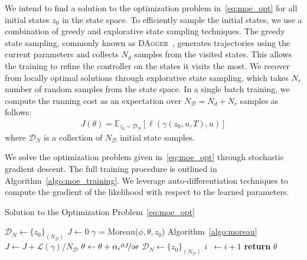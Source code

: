 We intend to find a solution to the optimization problem
in~\eqref{eq:moe_opt} for all initial states $z_0$ in the
state space.
%
To efficiently sample the initial states, we use a combination of greedy and
explorative state sampling techniques.
%
The greedy state sampling, commonly known as \textsc{DAgger}~\cite{ross2011no},
generates trajectories using the current parameters and collects $N_d$ samples
from the visited states. 
%
This allows the training to refine the controller on the states it visits the
most.
%
We recover from locally optimal solutions through explorative state sampling,
which takes $N_r$ number of random samples from the state space.
%
In a single batch training, we compute the running cost as an expectation
over $N_{\mathcal{D}} = N_d+N_r$ samples as follows:
\begin{align*}
    J(\theta) = \mathbb{E}_{z_0 \sim \mathcal{D}_N}[ \ell(\gamma(z_0, u, T), u)]
\end{align*}
\noindent where $\mathcal{D}_N$ is a collection of $N_{\mathcal{D}}$ initial state samples.

We solve the optimization problem given in~\eqref{eq:moe_opt} through stochastic
gradient descent.
%
The full training procedure is outlined in Algorithm~\eqref{algo:moe_training}.
%
We leverage auto-differentiation techniques to compute the gradient of the
likelihood with respect to the learned parameters.
\begin{algorithm}
      \caption{Solution to the Optimization Problem~\eqref{eq:moe_opt}}
      \label{algo:moe_training}
      \small
      \begin{algorithmic}[1]
          \algrenewcommand\algorithmicindent{0em} %
          \State $\mathcal{D}_N \gets \{z_0\}_{(N_{\mathcal{D}})}$   
          \algrenewcommand\algorithmicindent{1.1em} %
          \State $J \gets 0$
              \State $\gamma$ = Moreau($\phi, \theta, z_0$) \Comment Algorithm~\eqref{algo:moreau}
              \State $J \gets J + \mathcal{L}(\gamma)/N_{\mathcal{D}}$ 
          \EndFor
          \State $\theta \gets \theta + \alpha_i \nicefrac{\partial J}{\partial \theta}$
          \State $\mathcal{D}_N \gets \{z_0\}_{(N_{\mathcal{D}})}$
          \State $i \;\:\gets i + 1$
          \EndWhile
          \State \textbf{return} $\theta$
      \end{algorithmic}
  \end{algorithm}
